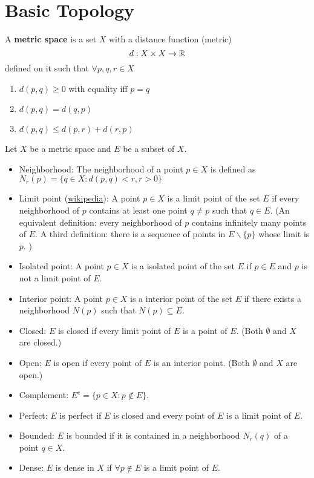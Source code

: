 \section{Basic Topology}
    \begin{defi}
        A \textbf{metric space} is a set $X$ with a distance function (metric) 
        \begin{equation}
            d : X \times X \to \mathbb{R}
        \end{equation} 
        defined on it such that $\forall p,q,r \in X$
        \begin{enumerate}
            \item $d(p, q) \geq 0$ with equality iff $p=q$
            \item $d(p,q) = d(q,p)$
            \item $d(p,q) \leq d(p,r) + d(r,p)$
        \end{enumerate}
    \end{defi}

    \begin{defi} Let $X$ be a metric space and $E$ be a subset of $X$.
        \begin{itemize}
            \item Neighborhood: The neighborhood of a point $p \in X$ is defined as $N_r(p) = \{ q \in X: d(p,q) < r, r > 0 \}$
            \item Limit point (\href{https://en.wikipedia.org/wiki/Limit_point}{wikipedia}): A point $p \in X$ is a limit point of the set $E$ if every neighborhood of $p$ contains at least one point $q \neq p$ such that $q \in E$. (An equivalent definition: every neighborhood of $p$ contains infinitely many points of $E$. A third definition: there is a sequence of points in $E \backslash \{p\}$ whose limit is $p$. )
            \item Isolated point: A point $p \in X$ is a isolated point of the set $E$ if $p \in E$ and $p$ is not a limit point of $E$.
            \item Interior point: A point $p \in X$ is a interior point of the set $E$ if there exists a neighborhood $N(p)$ such that $N(p) \subseteq E$.
            \item Closed: $E$ is closed if every limit point of $E$ is a point of $E$. (Both $\emptyset$ and $X$ are closed.)
            \item Open: $E$ is open if every point of $E$ is an interior point. (Both $\emptyset$ and $X$ are open.)
            \item Complement: $E^c = \{ p \in X : p \notin E \}$.
            \item Perfect: $E$ is perfect if $E$ is closed and every point of $E$ is a limit point of $E$.
            \item Bounded: $E$ is bounded if it is contained in a neighborhood $N_r(q)$ of a point $q \in X$.
            \item Dense: $E$ is dense in $X$ if $\forall p \notin E$ is a limit point of $E$.
        \end{itemize}
    \end{defi}

